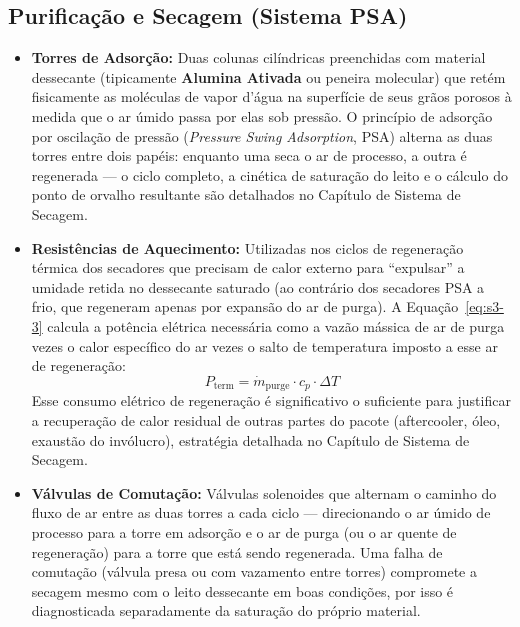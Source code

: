 \documentclass[12pt,a4paper]{article}
\numberwithin{equation}{section}
\numberwithin{table}{section}
\numberwithin{figure}{section}
\begin{document}
{	\subsection{\textbf{Purificação e Secagem (Sistema PSA)}}
	\begin{itemize}
		\item \textbf{Torres de Adsorção:} Duas colunas cilíndricas preenchidas com material dessecante (tipicamente \textbf{Alumina Ativada} ou peneira molecular) que retém fisicamente as moléculas de vapor d'água na superfície de seus grãos porosos à medida que o ar úmido passa por elas sob pressão. O princípio de adsorção por oscilação de pressão (\textit{Pressure Swing Adsorption}, PSA) alterna as duas torres entre dois papéis: enquanto uma seca o ar de processo, a outra é regenerada — o ciclo completo, a cinética de saturação do leito e o cálculo do ponto de orvalho resultante são detalhados no Capítulo de Sistema de Secagem.
		\item \textbf{Resistências de Aquecimento:} Utilizadas nos ciclos de regeneração térmica dos secadores que precisam de calor externo para ``expulsar'' a umidade retida no dessecante saturado (ao contrário dos secadores PSA a frio, que regeneram apenas por expansão do ar de purga). A Equação~\eqref{eq:s3-3} calcula a potência elétrica necessária como a vazão mássica de ar de purga vezes o calor específico do ar vezes o salto de temperatura imposto a esse ar de regeneração:
		\begin{equation}\label{eq:s3-3}
 P_{\text{term}} = \dot{m}_{\text{purge}} \cdot c_p \cdot \Delta T
\end{equation}
		Esse consumo elétrico de regeneração é significativo o suficiente para justificar a recuperação de calor residual de outras partes do pacote (aftercooler, óleo, exaustão do invólucro), estratégia detalhada no Capítulo de Sistema de Secagem.
		\item \textbf{Válvulas de Comutação:} Válvulas solenoides que alternam o caminho do fluxo de ar entre as duas torres a cada ciclo — direcionando o ar úmido de processo para a torre em adsorção e o ar de purga (ou o ar quente de regeneração) para a torre que está sendo regenerada. Uma falha de comutação (válvula presa ou com vazamento entre torres) compromete a secagem mesmo com o leito dessecante em boas condições, por isso é diagnosticada separadamente da saturação do próprio material.
	\end{itemize}
	
}
\end{document}
